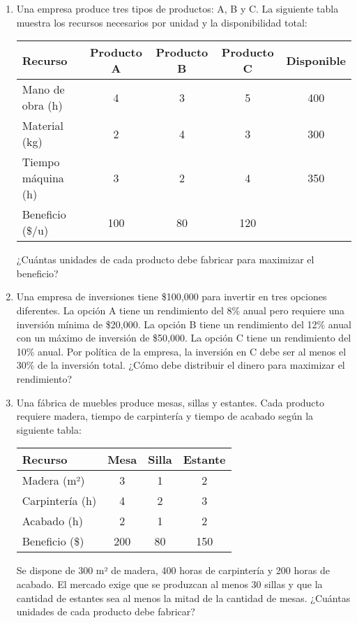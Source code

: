 \documentclass[12pt]{article}
\begin{document}
\begin{enumerate}
\item Una empresa produce tres tipos de productos: A, B y C. La siguiente tabla muestra los recursos necesarios por unidad y la disponibilidad total:

\begin{center}
\begin{tabular}{lcccc}
\toprule
Recurso & Producto A & Producto B & Producto C & Disponible \\
\midrule
Mano de obra (h) & 4 & 3 & 5 & 400 \\
Material (kg) & 2 & 4 & 3 & 300 \\
Tiempo máquina (h) & 3 & 2 & 4 & 350 \\
\midrule
Beneficio (\$/u) & 100 & 80 & 120 & \\
\bottomrule
\end{tabular}
\end{center}

¿Cuántas unidades de cada producto debe fabricar para maximizar el beneficio?

\item Una empresa de inversiones tiene \$100,000 para invertir en tres opciones diferentes. La opción A tiene un rendimiento del 8\% anual pero requiere una inversión mínima de \$20,000. La opción B tiene un rendimiento del 12\% anual con un máximo de inversión de \$50,000. La opción C tiene un rendimiento del 10\% anual. Por política de la empresa, la inversión en C debe ser al menos el 30\% de la inversión total. ¿Cómo debe distribuir el dinero para maximizar el rendimiento?

\item Una fábrica de muebles produce mesas, sillas y estantes. Cada producto requiere madera, tiempo de carpintería y tiempo de acabado según la siguiente tabla:

\begin{center}
\begin{tabular}{lccc}
\toprule
Recurso & Mesa & Silla & Estante \\
\midrule
Madera (m²) & 3 & 1 & 2 \\
Carpintería (h) & 4 & 2 & 3 \\
Acabado (h) & 2 & 1 & 2 \\
\midrule
Beneficio (\$) & 200 & 80 & 150 \\
\bottomrule
\end{tabular}
\end{center}

Se dispone de 300 m² de madera, 400 horas de carpintería y 200 horas de acabado. El mercado exige que se produzcan al menos 30 sillas y que la cantidad de estantes sea al menos la mitad de la cantidad de mesas. ¿Cuántas unidades de cada producto debe fabricar?


\end{enumerate}
\end{document}
